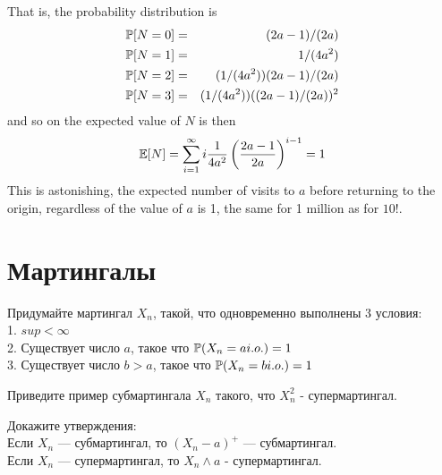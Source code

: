 \begin{problem}
\begin{sol}
That is, the probability distribution is
\begin{eqnarray*}
  \P[N = 0] &=& (2a-1)/(2a) \\
  \P[N = 1] &=& 1/(4a^2) \\
  \P[N = 2] &=& ( 1/(4 a^2)) (2a-1)/(2a) \\
  \P[N = 3] &=& ( 1/(4 a^2)) ((2a-1)/(2a))^2 \\
\end{eqnarray*}
and so on the expected value of $N$ is then
\[
    \E[N] = \sum_{i=1}^{\infty} i \frac{1}{4a^2} \left(
    \frac{2a-1}{2a} \right)^{i-1} = 1
\]
This is astonishing, the expected number of visits to $a$
before returning to the origin, regardless of the value of $a$
is 1, the same for 1 million as for $10$!.
\end{sol}
\end{problem}



\section{Мартингалы}

\begin{problem}
Придумайте мартингал $X_{n}$, такой, что одновременно выполнены 3 условия: \\
1. $sup <\infty$ \\
2. Существует число $a$, такое что $\P(X_{n}=a i.o.)=1$ \\
3. Существует число $b>a$, такое что $\P(X_{n}=b i.o.)=1$

\begin{sol}

\end{sol}
\end{problem}

\begin{problem}
Приведите пример субмартингала $X_{n}$ такого, что $X_{n}^{2}$ -
супермартингал.

\begin{sol}

\end{sol}
\end{problem}

\begin{problem}
Докажите утверждения: \\
Если $X_{n}$ — субмартингал, то $(X_{n}-a)^{+}$ — субмартингал. \\
Если $X_{n}$ — супермартингал, то $X_{n} \wedge a$ -
супермартингал.

\begin{sol}

\end{sol}
\end{problem}

